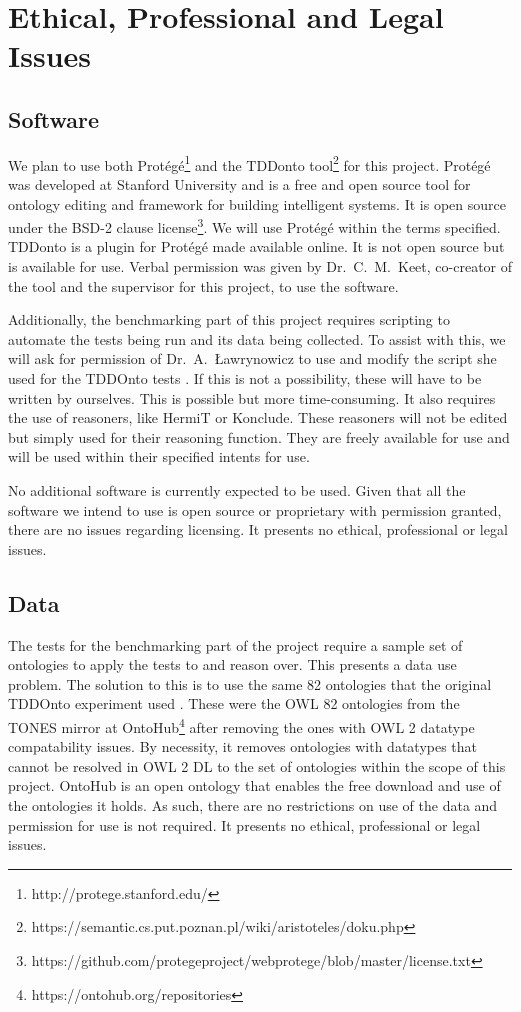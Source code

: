 \documentclass[draft]{sig-alternate}
\begin{document}
\section{Ethical, Professional and Legal Issues}

\subsection{Software}

We plan to use both Prot\'eg\'e\footnote{http://protege.stanford.edu/} and the TDDonto tool\footnote{https://semantic.cs.put.poznan.pl/wiki/aristoteles/doku.php} for this project. Prot\'eg\'e was developed at Stanford University and is a free and open source tool for ontology editing and framework for building intelligent systems. It is open source under the BSD-2 clause license\footnote{https://github.com/protegeproject/webprotege/blob/master/license.txt}. We will use Prot\'eg\'e within the terms specified. TDDonto is a plugin for Prot\'eg\'e made available online. It is not open source but is available for use. Verbal permission was given by Dr.\ C.\ M.\ Keet, co-creator of the tool and the supervisor for this project, to use the software.

Additionally, the benchmarking part of this project requires scripting to automate the tests being run and its data being collected. To assist with this, we will ask for permission of Dr.\ A.\ {\L}awrynowicz to use and modify the script she used for the TDDOnto tests \cite{DBLP:conf/dlog/LawrynowiczK16}. If this is not a possibility, these will have to be written by ourselves. This is possible but more time-consuming. It also requires the use of reasoners, like HermiT or Konclude. These reasoners will not be edited but simply used for their reasoning function. They are freely available for use and will be used within their specified intents for use.

No additional software is currently expected to be used. Given that all the software we intend to use is open source or proprietary with permission granted, there are no issues regarding licensing. It presents no ethical, professional or legal issues.

\subsection{Data}

The tests for the benchmarking part of the project require a sample set of ontologies to apply the tests to and reason over. This presents a data use problem. The solution to this is to use the same 82 ontologies that the original TDDOnto experiment used \cite{DBLP:conf/dlog/LawrynowiczK16}. These were the OWL 82 ontologies from the TONES mirror at OntoHub\footnote{https://ontohub.org/repositories} after removing the ones with OWL 2 datatype compatability issues. By necessity, it removes ontologies with datatypes that cannot be resolved in OWL 2 DL to the set of ontologies within the scope of this project. OntoHub is an open ontology that enables the free download and use of the ontologies it holds. As such, there are no restrictions on use of the data and permission for use is not required. It presents no ethical, professional or legal issues.
\end{document}
